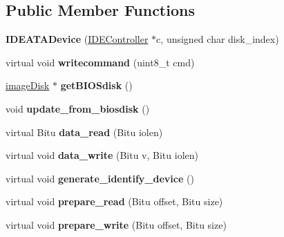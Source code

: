 \subsection*{Public Member Functions}
\begin{DoxyCompactItemize}
\item 
\hypertarget{classIDEATADevice_acd23ae1d9f384f6d3ba5c5b6a9d14de3}{{\bfseries I\-D\-E\-A\-T\-A\-Device} (\hyperlink{classIDEController}{I\-D\-E\-Controller} $\ast$c, unsigned char disk\-\_\-index)}\label{classIDEATADevice_acd23ae1d9f384f6d3ba5c5b6a9d14de3}

\item 
\hypertarget{classIDEATADevice_ae4122c663d2f3ccf138be4e3935f3958}{virtual void {\bfseries writecommand} (uint8\-\_\-t cmd)}\label{classIDEATADevice_ae4122c663d2f3ccf138be4e3935f3958}

\item 
\hypertarget{classIDEATADevice_a0156b7decf71ca4f5aff7bd71330bc89}{\hyperlink{classimageDisk}{image\-Disk} $\ast$ {\bfseries get\-B\-I\-O\-Sdisk} ()}\label{classIDEATADevice_a0156b7decf71ca4f5aff7bd71330bc89}

\item 
\hypertarget{classIDEATADevice_ade8754c3910543f79022ebbc7feaceb2}{void {\bfseries update\-\_\-from\-\_\-biosdisk} ()}\label{classIDEATADevice_ade8754c3910543f79022ebbc7feaceb2}

\item 
\hypertarget{classIDEATADevice_a4eba5d300ebb60afa9e4b2281d17046f}{virtual Bitu {\bfseries data\-\_\-read} (Bitu iolen)}\label{classIDEATADevice_a4eba5d300ebb60afa9e4b2281d17046f}

\item 
\hypertarget{classIDEATADevice_ab18ccdb74b1656aedbd5ae5c4ee6d99f}{virtual void {\bfseries data\-\_\-write} (Bitu v, Bitu iolen)}\label{classIDEATADevice_ab18ccdb74b1656aedbd5ae5c4ee6d99f}

\item 
\hypertarget{classIDEATADevice_add93ce0c1dfe93a0f69b33a901f798dd}{virtual void {\bfseries generate\-\_\-identify\-\_\-device} ()}\label{classIDEATADevice_add93ce0c1dfe93a0f69b33a901f798dd}

\item 
\hypertarget{classIDEATADevice_a99929bd6d6cc8f1dda50d16ff350443c}{virtual void {\bfseries prepare\-\_\-read} (Bitu offset, Bitu size)}\label{classIDEATADevice_a99929bd6d6cc8f1dda50d16ff350443c}

\item 
\hypertarget{classIDEATADevice_a56f2ed829312bfc5cb14b48be3c2d3f1}{virtual void {\bfseries prepare\-\_\-write} (Bitu offset, Bitu size)}\label{classIDEATADevice_a56f2ed829312bfc5cb14b48be3c2d3f1}


\end{DoxyCompactItemize}
